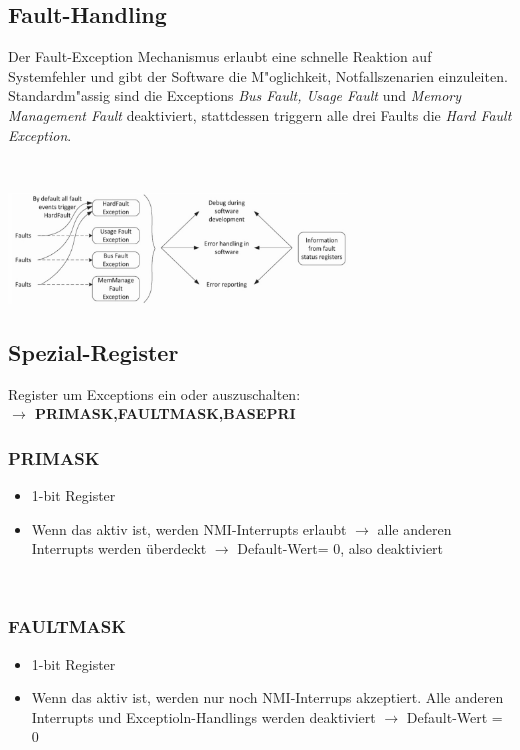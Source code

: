 \subsection{Fault-Handling}
\begin{minipage}{9cm}
	Der Fault-Exception Mechanismus erlaubt eine schnelle Reaktion auf Systemfehler und gibt der Software die M"oglichkeit, Notfallszenarien einzuleiten. Standardm"assig sind die Exceptions \textit{Bus Fault, Usage Fault} und \textit{Memory Management Fault} deaktiviert, stattdessen triggern alle drei Faults die \textit{Hard Fault Exception}.
\end{minipage}
%
\begin{minipage}{0.5cm}
	\-\
\end{minipage}
%
\begin{minipage}{9cm}
	\includegraphics[width=9cm]{images/fault-handling}
\end{minipage}
    
\subsection{Spezial-Register}     
Register um Exceptions ein oder auszuschalten:\\
\textbf{$\rightarrow$ PRIMASK,FAULTMASK,BASEPRI}

\begin{minipage}{9cm}
    \subsubsection{PRIMASK}
    \begin{itemize}
        \item 1-bit Register
        \item Wenn das aktiv ist, werden NMI-Interrupts erlaubt
        \subitem $\rightarrow$ alle anderen Interrupts werden überdeckt
        \subitem $\rightarrow$ Default-Wert= 0, also deaktiviert
    \end{itemize}
 \end{minipage}
 \begin{minipage}{0.5cm}
 	\-\
 \end{minipage}  
 \begin{minipage}{9cm}
 	\subsubsection{FAULTMASK}
    \begin{itemize}
        \item 1-bit Register
        \item Wenn das aktiv ist, werden nur noch NMI-Interrups akzeptiert.\newline
        Alle anderen Interrupts und Exceptioln-Handlings werden deaktiviert
        \subitem $\rightarrow$ Default-Wert = 0
    \end{itemize}
 \end{minipage}

